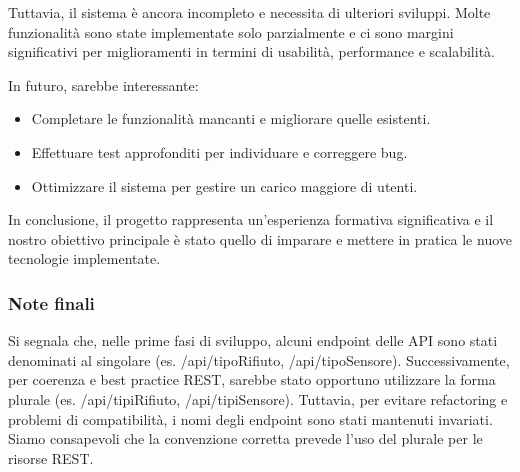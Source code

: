 Tuttavia, il sistema è ancora incompleto e necessita di ulteriori sviluppi. Molte funzionalità sono state implementate solo parzialmente e ci sono margini significativi per miglioramenti in termini di usabilità, performance e scalabilità.

In futuro, sarebbe interessante:
\begin{itemize}
    \item Completare le funzionalità mancanti e migliorare quelle esistenti.
    \item Effettuare test approfonditi per individuare e correggere bug.
    \item Ottimizzare il sistema per gestire un carico maggiore di utenti.
\end{itemize}

In conclusione, il progetto rappresenta un'esperienza formativa significativa e il nostro obiettivo principale è stato quello di imparare e mettere in pratica le nuove tecnologie implementate.

\subsubsection{Note finali}
Si segnala che, nelle prime fasi di sviluppo, alcuni endpoint delle API sono stati denominati al singolare (es. /api/tipoRifiuto, /api/tipoSensore). Successivamente, per coerenza e best practice REST, sarebbe stato opportuno utilizzare la forma plurale (es. /api/tipiRifiuto, /api/tipiSensore). Tuttavia, per evitare refactoring e problemi di compatibilità, i nomi degli endpoint sono stati mantenuti invariati. Siamo consapevoli che la convenzione corretta prevede l’uso del plurale per le risorse REST.